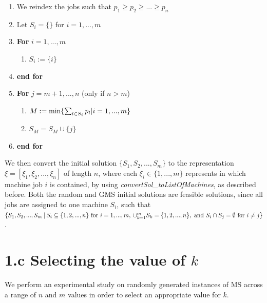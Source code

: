 \documentclass[12pt,a4paper,reqno]{article}
\begin{document}
\begin{enumerate}
\item We reindex the jobs such that $p_1 \geq p_2 \geq ... \geq p_n$
\item Let $S_i = \{ \}$ for $i=1,...,m$
\item \textbf{For} $i=1,...,m$
\begin{enumerate}
\item $S_i := \{i \}$
\end{enumerate}
\item[] \textbf{end for}
\item \textbf{For} $j=m+1,...,n$ (only if $n > m$)
\begin{enumerate}
\item $M := \textnormal{min} \{ \sum_{l \in S_i} p_l | i = 1,...,m \}$
\item $S_M = S_M \cup \{ j \}$
\end{enumerate}
\item[] \textbf{end for}
\end{enumerate}

We then convert the initial solution $\{S_1,S_2,...,S_m\}$ to the representation $\xi = [\xi_1,\xi_2,...,\xi_n]$ of length $n$, where each $\xi_i \in \{1,...,m\}$ represents in which machine job $i$ is contained, by using \textit{convertSol\_toListOfMachines}, as described before. Both the random and GMS initial solutions are feasible solutions, since all jobs are assigned to one machine $S_i$, such that $\{S_1,S_2,...,S_m \> | \> S_i \subseteq \{1,2,...,n\} \textnormal{ for } i=1,...,m, \> \cup_{k=1}^m S_k = \{1,2,...,n\}, \textnormal{ and } S_i \cap S_j = \emptyset \textnormal{ for } i \neq j \}$. \\

\section*{1.c Selecting the value of $k$} \label{sec:selectingk}
We perform an experimental study on randomly generated instances of MS across a range of $n$ and $m$ values in order to select an appropriate value for $k$. \\
\end{document}

